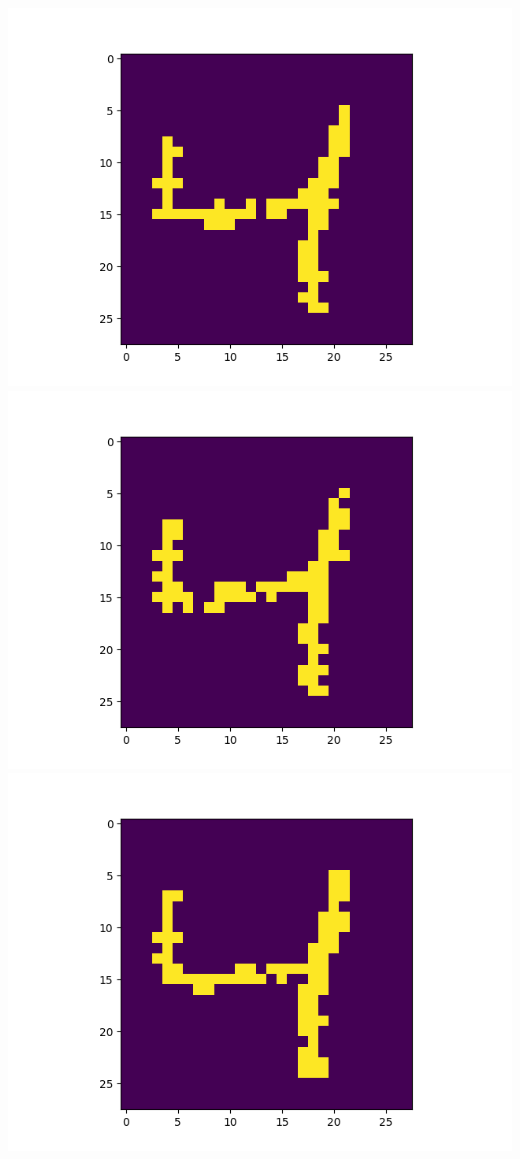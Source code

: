 \includegraphics[scale=0.2]{./bilder/comparison/prob/19}
\includegraphics[scale=0.2]{./bilder/comparison/prob/20}
\includegraphics[scale=0.2]{./bilder/comparison/prob/21}
